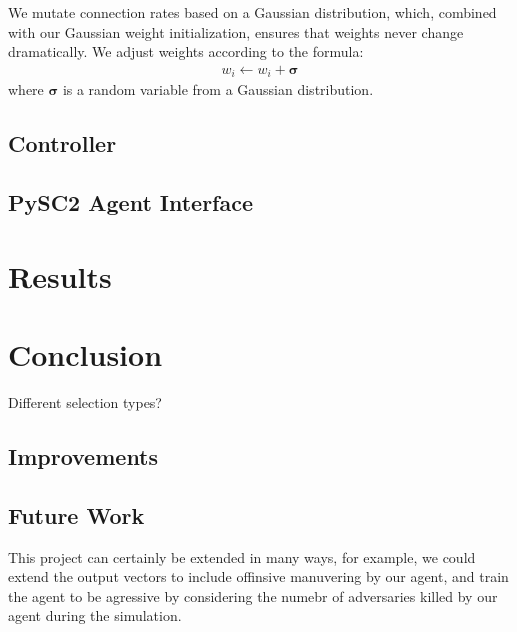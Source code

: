 \documentclass{article}
\begin{document}
\begin{multicols}{2}
We mutate connection rates based on a Gaussian distribution, which, combined
with our Gaussian weight initialization, ensures that weights never change
dramatically. We adjust weights according to the formula:
\begin{align}
  w_i \leftarrow w_i + \bm{\sigma}
\end{align}
where $\bm{\sigma}$ is a random variable from a Gaussian distribution.

\subsection{Controller}

\subsection{PySC2 Agent Interface}

\section{Results}

\section{Conclusion}
Different selection types?

\subsection{Improvements}

\subsection{Future Work}
This project can certainly be extended in many ways, for example, we could
extend the output vectors to include offinsive manuvering by our agent, and
train the agent to be agressive by considering the numebr of adversaries killed
by our agent during the simulation.

\end{multicols}

\\~\\
\hline
\\~\\
\end{document}

